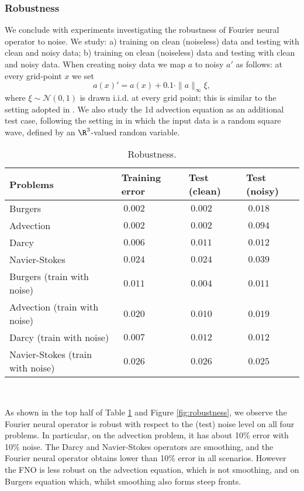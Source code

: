 \subsubsection{Robustness}
We conclude with experiments investigating the robustness of Fourier neural operator
to noise. We study: a) training on clean (noiseless) data and testing with clean and
noisy data; b) training on clean (noiseless) data and testing with clean and
noisy data. When creating noisy data we map $a$ to noisy $a'$ as follows: 
at every grid-point $x$ we set
\[a(x)' = a(x) + 0.1 \cdot \|a\|_{\infty}\xi,\]
where  $\xi \sim \mathcal{N}(0, 1)$ is drawn i.i.d. at every grid point;
this is similar to the setting adopted in \cite{lu2021comprehensive}. 
We also study the 1d advection 
equation as an additional test case, following the setting in \cite{lu2021comprehensive}
in which the input data is a random square wave, defined by an $\R^3$-valued random
variable.


\begin{table}[h]
\begin{center}
\begin{tabular}{l|lll}
Problems
& Training error
& Test (clean)
& Test (noisy)  \\
\hline 
Burgers        & $\ 0.002$  & $\ 0.002$  & $\ 0.018$   \\
Advection        & $\ 0.002$  & $\ 0.002$  & $\ 0.094$  \\
Darcy       & $\ 0.006$  & $\ 0.011$  & $\ 0.012$  \\
Navier-Stokes       & $\ 0.024$  & $\ 0.024$  & $\ 0.039$  \\
\hline
Burgers  (train with noise)      & $\ 0.011$  & $\ 0.004$  & $\ 0.011$  \\
Advection  (train with noise)      & $\ 0.020$  & $\ 0.010$  & $\ 0.019$  \\
Darcy    (train with noise)   & $\ 0.007$  & $\ 0.012$  & $\ 0.012$  \\
Navier-Stokes   (train with noise)    & $\ 0.026$  & $\ 0.026$  & $\ 0.025$  \\
\hline
\end{tabular}\\
\end{center}
\caption{Robustness.}
\label{table:robustness}
\end{table}

As shown in the top half of Table \ref{table:robustness} and Figure \ref{fig:robustness}, we observe the Fourier neural operator is robust with respect to the (test) noise level on all four problems. In particular, on the advection problem, it has about 10\% error with 10\% noise. The Darcy and Navier-Stokes operators are smoothing, and the Fourier neural operator obtains lower than 10\% error in all scenarios. However the FNO is less robust on the advection equation, which is not smoothing, and on Burgers equation which, whilst smoothing also forms steep fronts.

